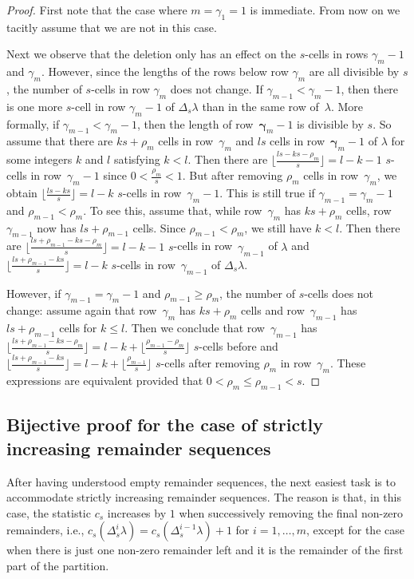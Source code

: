\documentclass[12pt,reqno]{amsart}
\numberwithin{equation}{section}
\theoremstyle{definition}
\newcommand{\pos}{{\boldsymbol\gamma}}
\newcommand{\posi}{{\gamma}}
\begin{document}
\begin{proof}
First note that the case where $m=\gamma_1=1$ is immediate.
From now on we tacitly assume that we are not in this case.

Next we observe that
the deletion only has an effect on the $s$-cells in rows $\posi_m-1$ and $\posi_m$. However, since the lengths of the rows below row $\posi_m$ are all divisible by $s$, the number of $s$-cells in row $\posi_m$ does not change. If $\posi_{m-1}<\posi_m-1$, then there is one more $s$-cell in row $\posi_{m}-1$ of $\Delta_s \lambda$ than in the same row
of~$\lambda$. More formally, if $\posi_{m-1}<\posi_m-1$, then the length of row~$\pos_m-1$ is divisible by $s$. So assume that there are $k s+\rho_m$ cells in row~$\posi_m$ and $l s$ cells in row~$\pos_m-1$ of $\lambda$ for some integers $k$ and $l$ satisfying $k<l$. Then there are $\lfloor \frac{l s - k s -\rho_m}{s} \rfloor = l-k-1$ $s$-cells in row~$\posi_m-1$ since $0 < \frac{\rho_m}{s} < 1$. But after removing $\rho_m$ cells in row~$\posi_m$, we obtain $\lfloor \frac{l s - k s}{s} \rfloor = l-k$ $s$-cells in row~$\posi_m-1$.
This is still true if $\posi_{m-1}=\posi_m-1$ and $\rho_{m-1} < \rho_m$.
To see this, assume that, while row~$\posi_m$ has $k s+\rho_m$ cells, row~$\posi_{m-1}$ now has $l s + \rho_{m-1}$ cells. Since $\rho_{m-1} < \rho_{m}$, we still have $k<l$. Then there are $\lfloor \frac{l s + \rho_{m-1} - k s -\rho_m}{s} \rfloor = l-k-1$ $s$-cells in row~$\posi_{m-1}$ of $\lambda$ and $\lfloor \frac{l s + \rho_{m-1} - k s}{s} \rfloor = l-k$ $s$-cells in row~$\posi_{m-1}$ of $\Delta_s \lambda$.

However, if
$\posi_{m-1}=\posi_m-1$ and $\rho_{m-1} \ge \rho_m$, the number of $s$-cells does not change:
assume again that row~$\posi_m$ has $k s+\rho_m$ cells and row~$\posi_{m-1}$ has $l s + \rho_{m-1}$ cells for $k \le l$. Then we conclude that row~$\posi_{m-1}$ has $\lfloor \frac{l s + \rho_{m-1} - k s -\rho_m}{s} \rfloor = l-k+\lfloor \frac{\rho_{m-1} -\rho_m}{s} \rfloor$ $s$-cells before and $\lfloor \frac{l s + \rho_{m-1} - k s}{s} \rfloor =l-k+ \lfloor \frac{\rho_{m-1}}{s} \rfloor$ $s$-cells after removing $\rho_m$ in row~$\posi_m$. These expressions are equivalent provided that $0 < \rho_m \le \rho_{m-1} < s$.
\end{proof}



\subsection{Bijective proof for the case of strictly increasing
remainder sequences}
\label{sec:strict}
After having understood empty remainder sequences, the next easiest task is to accommodate strictly increasing remainder sequences. 
{The reason is that, in this case, the statistic $c_s$ increases by $1$ when successively removing the final non-zero remainders, i.e., 
$c_s(\Delta_s^i \lambda) = c_s(\Delta_s^{i-1} \lambda)+1$ for $i=1,\ldots,m$, except for the case when there is just one non-zero remainder left 
and it is the remainder of the first part of the partition.}
\end{document}

